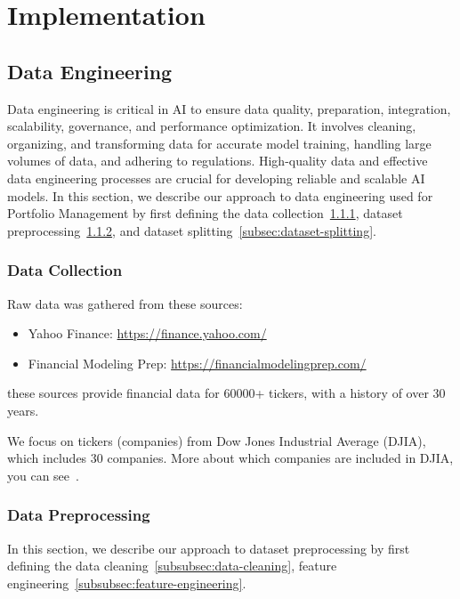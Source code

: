 \documentclass[../xlapes02]{subfiles}
\begin{document}
    \chapter{Implementation}\label{ch:implementation}


    \section{Data Engineering}\label{sec:data-engineering}
    Data engineering is critical in AI to ensure data quality, preparation, integration, scalability, governance, and performance optimization. It involves cleaning, organizing, and transforming data for accurate model training, handling large volumes of data, and adhering to regulations. High-quality data and effective data engineering processes are crucial for developing reliable and scalable AI models. In this section, we describe our approach to data engineering used for Portfolio Management by first defining the data collection~\cref{subsec:data-collection}, dataset preprocessing~\cref{subsec:dataset-preprocessing}, and dataset splitting~\cref{subsec:dataset-splitting}.

    \subsection{Data Collection}\label{subsec:data-collection}
    Raw data was gathered from these sources:
    \begin{itemize}
        \item Yahoo Finance: \url{https://finance.yahoo.com/}
        \item Financial Modeling Prep: \url{https://financialmodelingprep.com/}
    \end{itemize}
    these sources provide financial data for 60000+ tickers, with a history of over 30 years.

    We focus on tickers (companies) from Dow Jones Industrial Average (DJIA), which includes 30 companies. More about which companies are included in DJIA, you can see~\cite{enwiki:1141766585}.

    \subsection{Data Preprocessing}\label{subsec:dataset-preprocessing}
    In this section, we describe our approach to dataset preprocessing by first defining the data cleaning~\cref{subsubsec:data-cleaning}, feature engineering~\cref{subsubsec:feature-engineering}.
\end{document}
